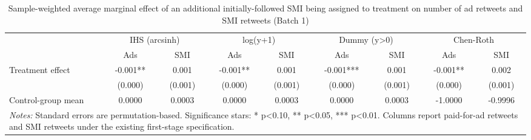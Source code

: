 \begin{table}[!htbp]
\centering
\caption{Sample-weighted average marginal effect of an additional initially-followed SMI being assigned to treatment on number of ad retweets and SMI retweets (Batch 1)}
\begin{tabular}{lcccccccc}
\hline
 & \multicolumn{2}{c}{IHS (arcsinh)} & \multicolumn{2}{c}{log(y+1)} & \multicolumn{2}{c}{Dummy (y>0)} & \multicolumn{2}{c}{Chen-Roth} \\
 & Ads & SMI & Ads & SMI & Ads & SMI & Ads & SMI \\
\hline
Treatment effect & -0.001** & 0.001 & -0.001** & 0.001 & -0.001*** & 0.001 & -0.001** & 0.002 \\
 & (0.000) & (0.001) & (0.000) & (0.001) & (0.000) & (0.001) & (0.000) & (0.001) \\
Control-group mean & 0.0000 & 0.0003 & 0.0000 & 0.0003 & 0.0000 & 0.0003 & -1.0000 & -0.9996 \\
\hline
\multicolumn{9}{l}{\parbox[t]{15.5cm}{\textit{Notes:} Standard errors are permutation-based. Significance stars: * p<0.10, ** p<0.05, *** p<0.01. Columns report paid-for-ad retweets and SMI retweets under the existing first-stage specification.}} \\
\end{tabular}
\end{table}
